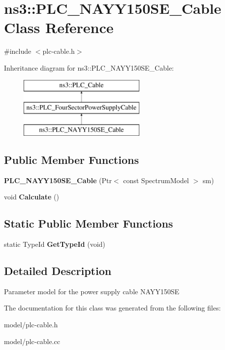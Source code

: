 \hypertarget{classns3_1_1PLC__NAYY150SE__Cable}{\section{ns3\-:\-:\-P\-L\-C\-\_\-\-N\-A\-Y\-Y150\-S\-E\-\_\-\-Cable \-Class \-Reference}
\label{classns3_1_1PLC__NAYY150SE__Cable}
}


{\ttfamily \#include $<$plc-\/cable.\-h$>$}

\-Inheritance diagram for ns3\-:\-:\-P\-L\-C\-\_\-\-N\-A\-Y\-Y150\-S\-E\-\_\-\-Cable\-:\begin{figure}[H]
\begin{center}
\leavevmode
\includegraphics[height=3.000000cm]{classns3_1_1PLC__NAYY150SE__Cable}
\end{center}
\end{figure}
\subsection*{\-Public \-Member \-Functions}
\begin{DoxyCompactItemize}
\item 
\hypertarget{classns3_1_1PLC__NAYY150SE__Cable_a270c1f0c8c35b725a01e2e5753393ba7}{{\bfseries \-P\-L\-C\-\_\-\-N\-A\-Y\-Y150\-S\-E\-\_\-\-Cable} (\-Ptr$<$ const \-Spectrum\-Model $>$ sm)}\label{classns3_1_1PLC__NAYY150SE__Cable_a270c1f0c8c35b725a01e2e5753393ba7}

\item 
\hypertarget{classns3_1_1PLC__NAYY150SE__Cable_a52a09bc86c85a4898971752b532257e7}{void {\bfseries \-Calculate} ()}\label{classns3_1_1PLC__NAYY150SE__Cable_a52a09bc86c85a4898971752b532257e7}

\end{DoxyCompactItemize}
\subsection*{\-Static \-Public \-Member \-Functions}
\begin{DoxyCompactItemize}
\item 
\hypertarget{classns3_1_1PLC__NAYY150SE__Cable_a12eca9c6aa8c7c029e12d322a420f42f}{static \-Type\-Id {\bfseries \-Get\-Type\-Id} (void)}\label{classns3_1_1PLC__NAYY150SE__Cable_a12eca9c6aa8c7c029e12d322a420f42f}

\end{DoxyCompactItemize}


\subsection{\-Detailed \-Description}
\-Parameter model for the power supply cable \-N\-A\-Y\-Y150\-S\-E 

\-The documentation for this class was generated from the following files\-:\begin{DoxyCompactItemize}
\item 
model/plc-\/cable.\-h\item 
model/plc-\/cable.\-cc\end{DoxyCompactItemize}

